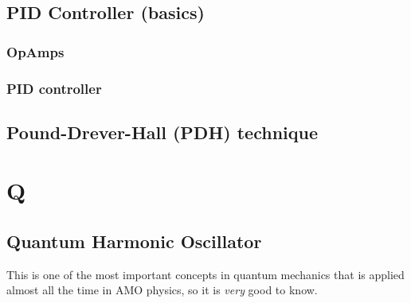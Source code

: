 \documentclass{book}
\theoremstyle{definition}
\begin{document}
\section*{PID Controller (basics)}


\subsection*{OpAmps}


\subsection*{PID controller}









\section*{Pound-Drever-Hall (PDH) technique}
\chapter*{Q}

\section*{Quantum Harmonic Oscillator}

This is one of the most important concepts in quantum mechanics that is applied almost all the time in AMO physics, so it is \textit{very} good to know. \\
\end{document}
